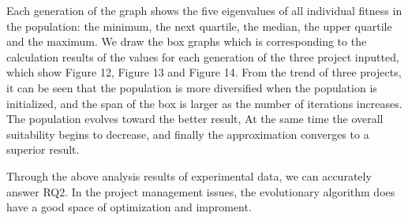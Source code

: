 Each generation of the graph shows the five eigenvalues of all individual 
fitness in the population: the minimum, the next quartile, the median, the 
upper quartile and the maximum. We draw the box graphs which is corresponding 
to the calculation results of the values for each generation of the three 
project inputted, which show Figure 12, Figure 13 and Figure 14. From the 
trend of three projects, it can be seen that the population is more 
diversified when the population is initialized, and the span of the box is 
larger as the number of iterations increases. The population evolves toward 
the better result, At the same time the overall suitability begins to 
decrease, and finally the approximation converges to a superior result.

Through the above analysis results of experimental data, we can accurately 
answer RQ2. In the project management issues, the evolutionary algorithm does 
have a good space of optimization and improment.



